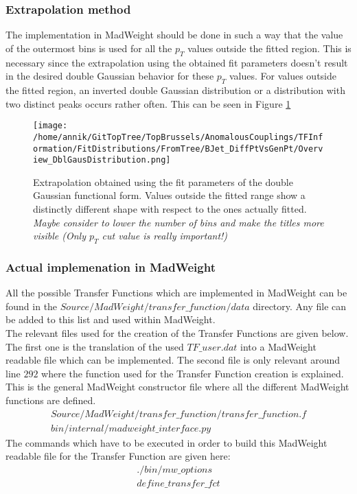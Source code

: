 \subsubsection{Extrapolation method}
The implementation in MadWeight should be done in such a way that the value of the outermost bins is used for all the $p_T$ values outside the fitted region. This is necessary since the extrapolation using the obtained fit parameters doesn't result in the desired double Gaussian behavior for these $p_T$ values. For values outside the fitted region, an inverted double Gaussian distribution or a distribution with two distinct peaks occurs rather often. This can be seen in Figure \ref{fig::doubleGaussExtrap}
\begin{figure}[!h]
  \centering
  \texttt{[image: /home/annik/GitTopTree/TopBrussels/AnomalousCouplings/TFInformation/FitDistributions/FromTree/BJet\_DiffPtVsGenPt/Overview\_DblGausDistribution.png]}
  \caption{Extrapolation obtained using the fit parameters of the double Gaussian functional form. Values outside the fitted range show a distinctly different shape with respect to the ones actually fitted. \textit{Maybe consider to lower the number of bins and make the titles more visible (Only $p_T$ cut value is really important!)}} \label{fig::doubleGaussExtrap} 
\end{figure}

\subsubsection{Actual implemenation in MadWeight}
All the possible Transfer Functions which are implemented in MadWeight can be found in the $Source/MadWeight/transfer\_function/data$ directory. Any file can be added to this list and used within MadWeight.\\
The relevant files used for the creation of the Transfer Functions are given below. The first one is the translation of the used $TF\_user.dat$ into a MadWeight readable file which can be implemented. The second file is only relevant around line $292$ where the function used for the Transfer Function creation is explained. This is the general MadWeight constructor file where all the different MadWeight functions are defined.
\begin{eqnarray} 
 Source/MadWeight/transfer\_function/transfer\_function.f \nonumber \\
 bin/internal/madweight\_interface.py \nonumber
\end{eqnarray}
The commands which have to be executed in order to build this MadWeight readable file for the Transfer Function are given here:
\begin{eqnarray} 
 ./bin/mw\_options \nonumber \\
 define\_transfer\_fct \nonumber
\end{eqnarray}

